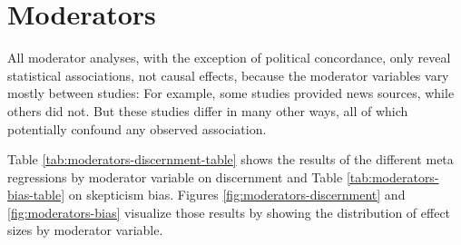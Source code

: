\documentclass[
  doc,floatsintext]{apa6}
\begin{document}
\clearpage

\section{Moderators}\label{moderators}

\FloatBarrier

All moderator analyses, with the exception of political concordance, only reveal statistical associations, not causal effects, because the moderator variables vary mostly between studies: For example, some studies provided news sources, while others did not. But these studies differ in many other ways, all of which potentially confound any observed association.

Table \ref{tab:moderators-discernment-table} shows the results of the different meta regressions by moderator variable on discernment and Table \ref{tab:moderators-bias-table} on skepticism bias. Figures \ref{fig:moderators-discernment} and \ref{fig:moderators-bias} visualize those results by showing the distribution of effect sizes by moderator variable.
\end{document}
